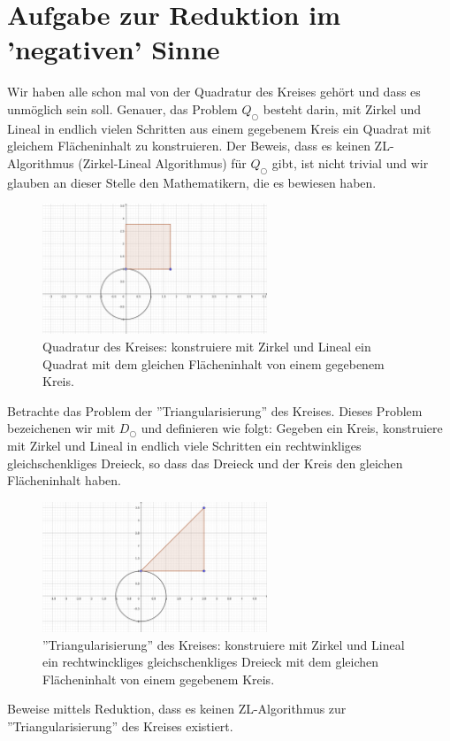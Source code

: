 \documentclass[
	12pt, %
	german, %
]{fphw}
\begin{document}

\section*{Aufgabe zur Reduktion im 'negativen' Sinne}

\begin{problem}
Wir haben alle schon mal von der Quadratur des Kreises gehört und dass es unmöglich sein soll. Genauer, das Problem \(Q_{\bigcirc}\) besteht darin, mit Zirkel und Lineal in endlich vielen Schritten aus einem gegebenem Kreis ein Quadrat mit gleichem Flächeninhalt zu konstruieren. Der Beweis, dass es keinen ZL-Algorithmus (Zirkel-Lineal Algorithmus) für \(Q_{\bigcirc}\) gibt, ist nicht trivial und wir glauben an dieser Stelle den Mathematikern, die es bewiesen haben.

\begin{figure}[H]
	\centering
	\includegraphics[width=0.6\textwidth]{Negativ-QuadraturDesKreises1.png}
	\caption{Quadratur des Kreises: konstruiere mit Zirkel und Lineal ein Quadrat mit dem gleichen Flächeninhalt von einem gegebenem Kreis.}
\end{figure}

Betrachte das Problem der ''Triangularisierung'' des Kreises. Dieses Problem bezeichenen wir mit \(D_{\bigcirc}\) und definieren wie folgt: Gegeben ein Kreis, konstruiere mit Zirkel und Lineal in endlich viele Schritten ein rechtwinkliges gleichschenkliges Dreieck, so dass das Dreieck und der Kreis den gleichen Flächeninhalt haben.
\begin{figure}[H]
	\centering
	\includegraphics[width=0.6\textwidth]{Negativ-TriangulaturDesKreises1.png}
	\caption{''Triangularisierung'' des Kreises: konstruiere mit Zirkel und Lineal ein rechtwinckliges gleichschenkliges Dreieck mit dem gleichen Flächeninhalt von einem gegebenem Kreis.}
\end{figure}
Beweise mittels Reduktion, dass es keinen ZL-Algorithmus zur ''Triangularisierung'' des Kreises existiert.
\end{problem}
\end{document}
